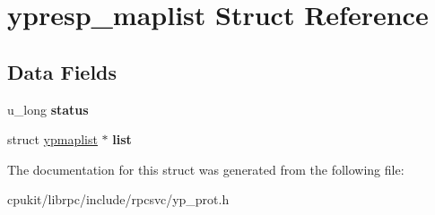 \hypertarget{structypresp__maplist}{}\section{ypresp\+\_\+maplist Struct Reference}
\label{structypresp__maplist}
\subsection*{Data Fields}
\begin{DoxyCompactItemize}
\item 
\mbox{\label{structypresp__maplist_ac28d805238910cf31b3d36275a092325}} 
u\+\_\+long {\bfseries status}
\item 
\mbox{\label{structypresp__maplist_a40e5ab1613b4c67b27f272777bb77eb3}} 
struct \mbox{\hyperlink{structypmaplist}{ypmaplist}} $\ast$ {\bfseries list}
\end{DoxyCompactItemize}


The documentation for this struct was generated from the following file\+:\begin{DoxyCompactItemize}
\item 
cpukit/librpc/include/rpcsvc/yp\+\_\+prot.\+h\end{DoxyCompactItemize}
